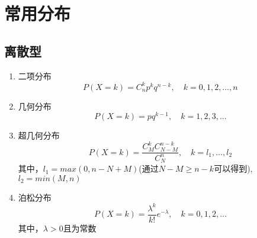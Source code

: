 \section{常用分布}

\subsection{离散型}
\begin{enumerate}
	\item 二项分布
	\begin{equation}
		P(X=k) = C_n^kp^kq^{n-k}, \quad k=0, 1, 2, \dots, n
	\end{equation}

	\item 几何分布
	\begin{equation}
		P(X=k) = pq^{k-1}, \quad k=1, 2, 3, ...
	\end{equation}

	\item 超几何分布
	\begin{equation}
	P(X=k) = \frac{C_M^kC_{N-M}^{n-k}}{C_N^n}, \quad k = l_1, \dots, l_2
	\end{equation}
	其中，$l_1 = max(0, n-N+M)$(通过$N-M {\geq} n-k$可以得到), $l_2=min(M,n)$

	\item 泊松分布
	\begin{equation}
		P(X=k) = \frac{\lambda^k}{k!}e^{-\lambda}, \quad k=0, 1, 2, \dots
	\end{equation}
	其中，$\lambda>0$且为常数
\end{enumerate}

